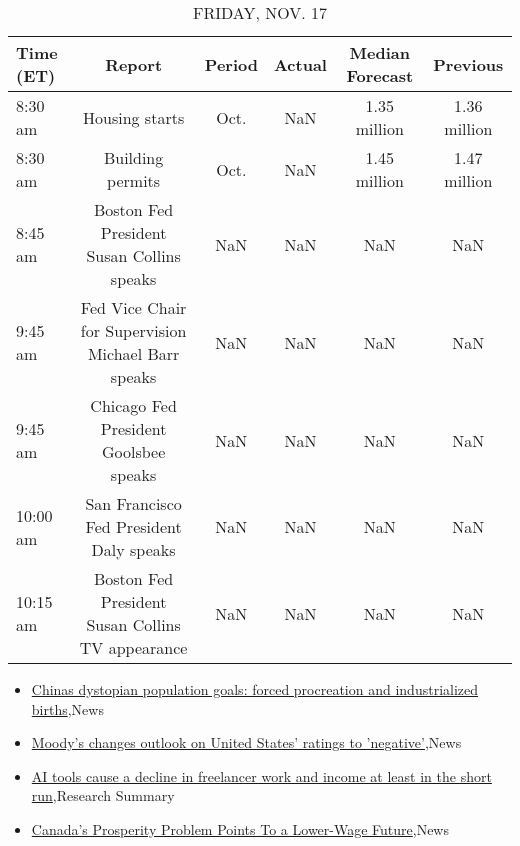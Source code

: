 \documentclass{article}%
\begin{document}
%


\begin{table}[htbp]%
\caption{FRIDAY, NOV. 17}%
\centering%
\begin{adjustbox}{width=1\textwidth}%
\begin{tabular}{lccccc}
\toprule
Time (ET) &                                             Report & Period & Actual & Median Forecast &     Previous \\
\midrule
  8:30 am &                                     Housing starts &   Oct. &    NaN &    1.35 million & 1.36 million \\
  8:30 am &                                   Building permits &   Oct. &    NaN &    1.45 million & 1.47 million \\
  8:45 am &          Boston Fed President Susan Collins speaks &    NaN &    NaN &             NaN &          NaN \\
  9:45 am & Fed Vice Chair for Supervision Michael Barr speaks &    NaN &    NaN &             NaN &          NaN \\
  9:45 am &              Chicago Fed President Goolsbee speaks &    NaN &    NaN &             NaN &          NaN \\
 10:00 am &            San Francisco Fed President Daly speaks &    NaN &    NaN &             NaN &          NaN \\
 10:15 am &   Boston Fed President Susan Collins TV appearance &    NaN &    NaN &             NaN &          NaN \\
\bottomrule
\end{tabular}
%
\end{adjustbox}%
\end{table}

%
\begin{itemize}%
\item%
\href{https://reddit.com/r/Economics/comments/17sgxtn/chinas\_dystopian\_population\_goals\_forced/}{Chinas dystopian population goals: forced procreation and industrialized births},News%
\item%
\href{https://reddit.com/r/Economics/comments/17sf7vj/moodys\_changes\_outlook\_on\_united\_states\_ratings/}{Moody's changes outlook on United States' ratings to 'negative'},News%
\item%
\href{https://reddit.com/r/Economics/comments/17sb1p0/ai\_tools\_cause\_a\_decline\_in\_freelancer\_work\_and/}{AI tools cause a decline in freelancer work and income  at least in the short run},Research Summary%
\item%
\href{https://reddit.com/r/Economics/comments/17sazgb/canadas\_prosperity\_problem\_points\_to\_a\_lowerwage/}{Canada's Prosperity Problem Points To a Lower-Wage Future},News%
\end{itemize}%
\end{document}

